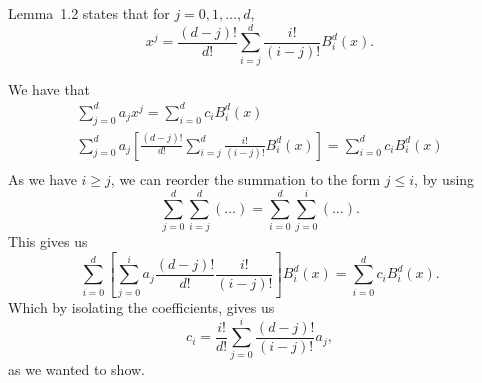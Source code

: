 \begin{solution}
    Lemma~1.2 states that for $j = 0, 1, \ldots, d$,
    \begin{equation*}
        x^j = \frac{(d - j)!}{d!} \sum_{i = j}^d \frac{i!}{(i - j)!} B_i^d(x).
    \end{equation*}

    We have that
    \begin{gather*}
        \sum_{j = 0}^d a_j x^j = \sum_{i = 0}^d c_i B_i^d(x) \\
        \sum_{j = 0}^d a_j \left[
            \frac{(d - j)!}{d!} \sum_{i = j}^d \frac{i!}{(i - j)!} B_i^d(x)
        \right]
        = \sum_{i = 0}^d c_i B_i^d(x) \\
    \end{gather*}
    As we have $i \geq j$, we can reorder the summation to the form $j \leq i$, by using
    \begin{equation*}
        \sum_{j = 0}^d \sum_{i = j}^d (\ldots) = \sum_{i = 0}^d \sum_{j = 0}^i (\ldots).
    \end{equation*}
    This gives us
    \begin{equation*}
        \sum_{i = 0}^d \left[
            \sum_{j = 0}^i a_j \frac{(d - j)!}{d!} \frac{i!}{(i - j)!}
        \right] B_i^d(x) = \sum_{i = 0}^d c_i B_i^d(x).
    \end{equation*}
    Which by isolating the coefficients, gives us
    \begin{equation*}
        c_i = \frac{i!}{d!} \sum_{j = 0}^i \frac{(d - j)!}{(i - j)!} a_j,
    \end{equation*}
    as we wanted to show.
\end{solution}